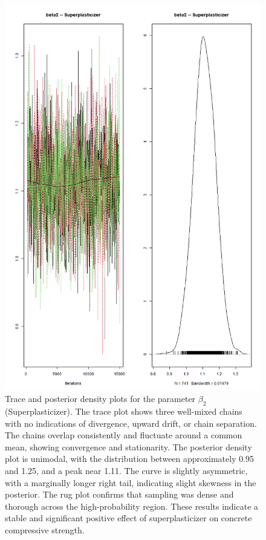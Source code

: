 \documentclass[]{article}
\begin{document}
\begin{figure}[H]
	\centering
	\includegraphics[width=0.7\linewidth]{img/img-trace-beta2}
	\caption{Trace and posterior density plots for the parameter $\beta_2$ (Superplasticizer). The trace plot shows three well-mixed chains with no indications of divergence, upward drift, or chain separation. The chains overlap consistently and fluctuate around a common mean, showing convergence and stationarity. The posterior density plot is unimodal, with the distribution between approximately 0.95 and 1.25, and a peak near 1.11. The curve is slightly asymmetric, with a marginally longer right tail, indicating slight skewness in the posterior. The rug plot confirms that sampling was dense and thorough across the high-probability region. These results indicate a stable and significant positive effect of superplasticizer on concrete compressive strength.}
	\label{fig:img-trace-beta2}
\end{figure}
\end{document}
